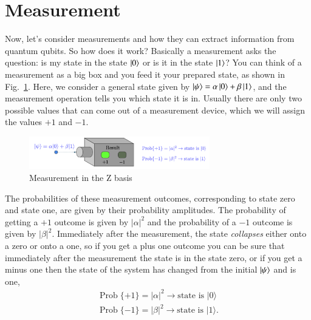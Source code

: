 
\section{Measurement}

Now, let's consider measurements and how they can extract information from quantum qubits. So how does it work? Basically a measurement asks the question: is my state in the state $\ket{0}$ or is it in the state $\ket{1}$? You can think of a measurement as a big box and you feed it your prepared state, as shown in Fig.~\ref{fig:z-measure}. Here, we consider a general state given by $\ket{\psi} = \alpha\ket{0}+\beta\ket{1}$, and the measurement operation tells you which state it is in. Usually there are only two possible values that can come out of a measurement device, which we will assign the values $+1$ and $-1$.

\begin{figure}[H]
    \centering
    \includegraphics[width=0.7\textwidth]{lesson2/Pauli_z_machine.pdf}
    
        \caption{Measurement in the Z basis}
    
    \label{fig:z-measure}
\end{figure}

The probabilities of these measurement outcomes, corresponding to state zero and state one, are given by their probability amplitudes. The probability of getting a $+1$ outcome is given by $|\alpha|^2$ and the probability of a $-1$ outcome is given by $|\beta|^2$. Immediately after the measurement, the state \emph{collapses} either onto a zero or onto a one, so if you get a plus one outcome you can be sure that immediately after the measurement the state is in the state zero, or if you get a minus one then the state of the system has changed from the initial $\ket{\psi}$ and is one,
\begin{align}
\operatorname{Prob}\{+1\}=|\alpha|^2 \rightarrow \textrm{state is } |0\rangle \\
\operatorname{Prob}\{-1\}=|\beta|^2 \rightarrow \textrm{state is } |1\rangle.
\end{align}

